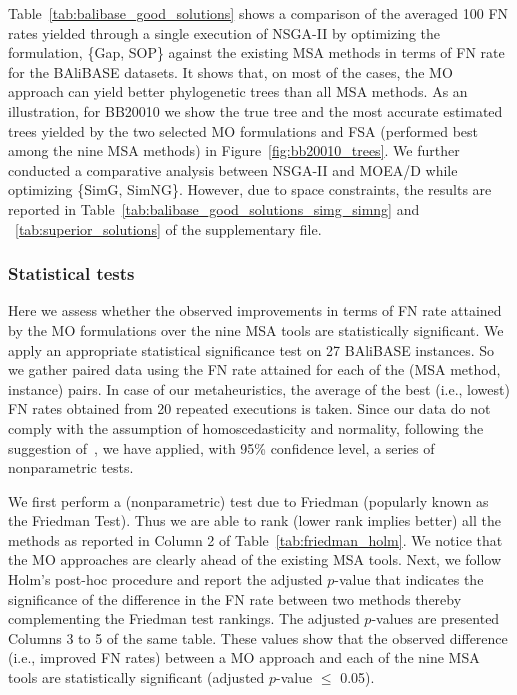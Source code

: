 


Table~\ref{tab:balibase_good_solutions} shows a comparison of the averaged 100 FN rates yielded through a single execution of NSGA-II by optimizing the formulation, \{Gap, SOP\} against the existing MSA methods in terms of FN rate for the BAliBASE datasets. It shows that, on most of the cases, the MO approach can yield better phylogenetic trees than all MSA methods. As an illustration, for BB20010 we show the true tree and the most accurate estimated trees yielded by the two selected MO formulations and FSA (performed best among the nine MSA methods) in Figure~\ref{fig:bb20010_trees}. We further conducted a comparative analysis between NSGA-II and MOEA/D while optimizing \{SimG, SimNG\}. However, due to space constraints, the results are reported in Table~\ref{tab:balibase_good_solutions_simg_simng} and ~\ref{tab:superior_solutions} of the supplementary file.




\subsubsection{Statistical tests}
Here we assess whether the observed improvements in terms of FN rate attained by the MO formulations over the nine  MSA tools are statistically significant.
We apply an appropriate statistical significance test on 27 BAliBASE instances. So we gather paired data using the FN rate attained for each of the (MSA method, instance) pairs. In case of our metaheuristics, the average of the best (i.e., lowest) FN rates obtained from 20 repeated executions is taken. Since our data do not comply with the assumption of homoscedasticity and normality, following the suggestion of~\cite{derrac2011practical}, we have applied, with 95\% confidence level, a series of nonparametric tests.  


We first perform a (nonparametric) test due to Friedman (popularly known as the Friedman Test). Thus we are able to rank (lower rank implies better) all the methods as reported in Column 2 of Table~\ref{tab:friedman_holm}. We notice that the MO approaches are clearly ahead of the existing MSA tools. Next, we follow Holm's post-hoc procedure and report the adjusted $p$-value that indicates the significance of the difference in the FN rate between two methods thereby complementing the Friedman test rankings. The adjusted $p$-values are presented Columns 3 to 5 of the same table. 
These values show that the observed difference (i.e., improved FN rates) between a MO approach and each of the nine MSA tools are statistically significant (adjusted $p$-value $\le$ 0.05).

